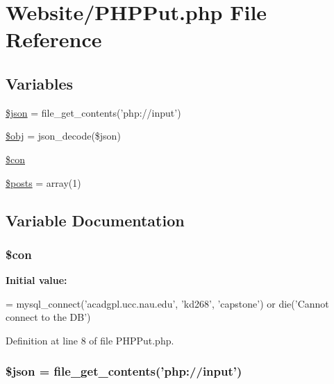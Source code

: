 \hypertarget{_p_h_p_put_8php}{\section{Website/\-P\-H\-P\-Put.php File Reference}
\label{_p_h_p_put_8php}
}
\subsection*{Variables}
\begin{DoxyCompactItemize}
\item 
\hyperlink{_p_h_p_put_8php_acedd13b51401130848ce18f4d5c52605}{\$json} = file\-\_\-get\-\_\-contents('php\-://input')
\item 
\hyperlink{_p_h_p_put_8php_a9008ed94ba185855b1723e367744b87e}{\$obj} = json\-\_\-decode(\$json)
\item 
\hyperlink{_p_h_p_put_8php_a0debe10448ec56a57b5509648408a549}{\$con}
\item 
\hyperlink{_p_h_p_put_8php_a9f4cad5a721e7f7711fba0bf0f7ec273}{\$posts} = array(1)
\end{DoxyCompactItemize}


\subsection{Variable Documentation}
\hypertarget{_p_h_p_put_8php_a0debe10448ec56a57b5509648408a549}{
\subsubsection[{\$con}]{\setlength{\rightskip}{0pt plus 5cm}\$con}}\label{_p_h_p_put_8php_a0debe10448ec56a57b5509648408a549}
{\bfseries Initial value\-:}
\begin{DoxyCode}
= mysql\_connect(\textcolor{stringliteral}{'acadgpl.ucc.nau.edu'}, \textcolor{stringliteral}{'kd268'}, \textcolor{stringliteral}{'capstone'})
        or die('Cannot connect to the DB')
\end{DoxyCode}


Definition at line 8 of file P\-H\-P\-Put.\-php.

\hypertarget{_p_h_p_put_8php_acedd13b51401130848ce18f4d5c52605}{
\subsubsection[{\$json}]{\setlength{\rightskip}{0pt plus 5cm}\$json = file\-\_\-get\-\_\-contents('php\-://input')}}\label{_p_h_p_put_8php_acedd13b51401130848ce18f4d5c52605}


